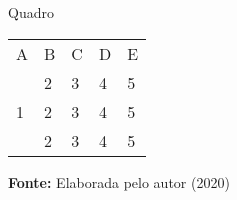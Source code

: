 \begin{quadro}
\caption{Quadro}
\label{quad:exemplo_de_quadro}
\centering
\begin{tabular}{|lllll|}
\cline{1-5}
A& B &  C& D &E  \\ \cline{1-5}
\multirow{3}{*}{1}  & 2 &  3& 4& 5 \\
 &  2 &  3& 4& 5  \\
 &  2 &  3& 4& 5 \\
 \cline{1-5}
\end{tabular}
  \par\medskip\ABNTEXfontereduzida\selectfont\textbf{Fonte:} Elaborada pelo autor (2020) \par\medskip
\end{quadro}